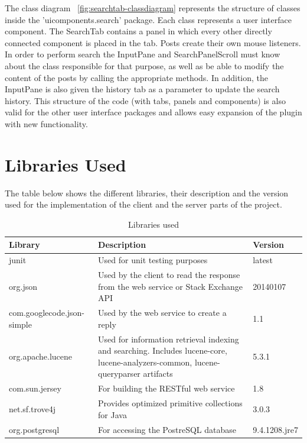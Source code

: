 \documentclass{l4proj}
\begin{document}
\noindent
The class diagram ~\ref{fig:searchtab-classdiagram} represents the structure of classes inside the 'uicomponents.search' package. Each class represents a user interface component. The SearchTab contains a panel  in which every other directly connected component is placed in the tab. Posts create their own mouse listeners. In order to perform search the InputPane and SearchPanelScroll must know about the class responsible for that purpose, as well as be able to modify the content of the posts by calling the appropriate methods. In addition, the InputPane is also given the history tab as a parameter to update the search history. This structure of the code (with tabs, panels and components) is also valid for the other user interface packages and allows easy expansion of the plugin with new functionality.

\newpage
\section{Libraries Used}

The table below shows the different libraries, their description and the version used for the implementation of the client and the server parts of the project.

\begin{table}[H]
\caption{Libraries used}
\centering
\def\arraystretch{1.5}
\begin{tabular}{p{4cm}p{9cm}p{2cm}}
\hline
Library & Description & Version \\
\hline
junit & Used for unit testing purposes & latest \\
org.json & Used by the client to read the response from the web service or Stack Exchange API & 20140107 \\
com.googlecode.json-simple & Used by the web service to create a reply & 1.1 \\
org.apache.lucene & Used for information retrieval indexing and searching. Includes lucene-core, lucene-analyzers-common, lucene-queryparser artifacts& 5.3.1 \\
com.sun.jersey & For building the RESTful web service & 1.8 \\
net.sf.trove4j & Provides optimized primitive collections for Java & 3.0.3 \\
org.postgresql & For accessing the PostreSQL database & 9.4.1208.jre7 \\
\hline
\end{tabular}
\label{table:librariesUsed}
\end{table}
\end{document}
